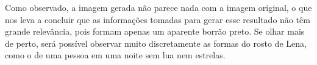 \documentclass[a4paper,12pt]{article}
\begin{document}
Como observado, a imagem gerada não parece nada com a imagem original, o que nos leva a concluir que as informações tomadas para gerar esse resultado não têm grande relevância, pois formam apenas um aparente borrão preto. Se olhar mais de perto, será possível observar muito discretamente as formas do rosto de Lena, como o de uma pessoa em uma noite sem lua nem estrelas.

% 

\end{document}
